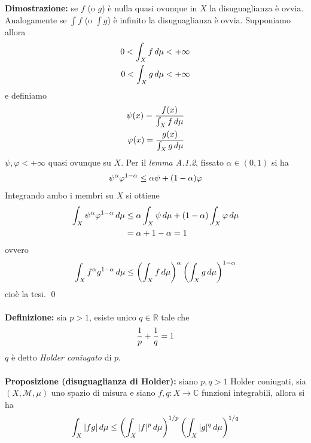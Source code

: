 \documentclass{article}
\numberwithin{equation}{subsection}
\begin{document}
\textbf{Dimostrazione:} se $f$ (o $g$) è nulla quasi ovunque in $X$ la disuguaglianza è ovvia. Analogamente se $\int f$ (o $\int g$) è infinito la disuguaglianza è ovvia. Supponiamo allora 
\begin{align*}
    0 < \int_X f \, d\mu < +\infty \notag \\
    0 < \int_X g \, d\mu < +\infty \notag
\end{align*}
e definiamo 
\begin{align*}
    \psi(x) = \frac{f(x)}{\int_X f \, d\mu} \notag \\
    \varphi(x) = \frac{g(x)}{\int_X g \, d\mu} \notag
\end{align*}
$\psi, \varphi < +\infty$ quasi ovunque su $X$. Per il \textit{lemma A.1.2}, fissato $\alpha \in (0, 1)$ si ha 
\begin{align*}
    \psi^\alpha \varphi^{1 - \alpha} \leq \alpha\psi + (1 - \alpha)\varphi \notag
\end{align*}
Integrando ambo i membri su $X$ si ottiene 
\begin{align*}
    \int_X \psi^\alpha\varphi^{1 - \alpha} \, d\mu &\leq \alpha\int_X \psi \, d\mu + (1 - \alpha)\int_X \varphi \, d\mu \notag \\
    &= \alpha + 1 - \alpha = 1 \notag
\end{align*}
ovvero
\begin{align*}
    \int_X f^\alpha g^{1 - \alpha} \, d\mu \leq \left(\int_X f \, d\mu\right)^\alpha\left(\int_X g \, d\mu\right)^{1 - \alpha} \notag
\end{align*}
cioè la tesi. \qed \\ \\
\textbf{Definizione:} sia $p > 1$, esiste unico $q \in \mathbb{R}$ tale che 
\begin{align*}
    \frac{1}{p} + \frac{1}{q} = 1 \notag
\end{align*}
$q$ è detto \textit{Holder coniugato} di $p$. \\ \\
\textbf{Proposizione (disuguaglianza di Holder):} siano $p, q > 1$ Holder coniugati, sia $(X, \mathcal{M}, \mu)$ uno spazio di misura e siano $f, q : X \longrightarrow \mathbb{C}$ funzioni integrabili, allora si ha 
\begin{align*}
    \int_X |fg| \, d\mu \leq \left(\int_X |f|^{p} \, d\mu\right)^{1/p}\left(\int_X |g|^{q} \, d\mu\right)^{1/q} \notag
\end{align*} \\
\end{document}
